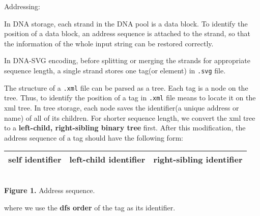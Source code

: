 \documentclass{article}
\begin{document}
\noindent
{\large Addressing:}
\par In DNA storage, each strand in the DNA pool is a data block. To identify the position of a data block, an address sequence is attached to the strand, so that the information of the whole input string can be restored correctly. 
\par In DNA-SVG encoding, before splitting or merging the strands for appropriate sequence length, a single strand stores one tag(or element) in \texttt{.svg} file. 
\par The structure of a \texttt{.xml} file can be parsed as a tree. Each tag is a node on the tree. Thus, to identify the position of a tag in \texttt{.xml} file means to locate it on the xml tree. In tree storage, each node saves the identifier(a unique address or name) of all of its children.
For shorter sequence length, we convert the xml tree to a \textbf{left-child, right-sibling binary tree} first. After this modification, the address sequence of a tag should have the following form:
\begin{center}
    \begin{tabular}{c|c|c}
        \hline
        self identifier & left-child identifier & right-sibling identifier\\
        \hline
    \end{tabular}
    \\[3pt]{\small \textbf{Figure 1.} Address sequence.}
\end{center}
where we use the \textbf{dfs order} of the tag as its identifier.
\end{document}
